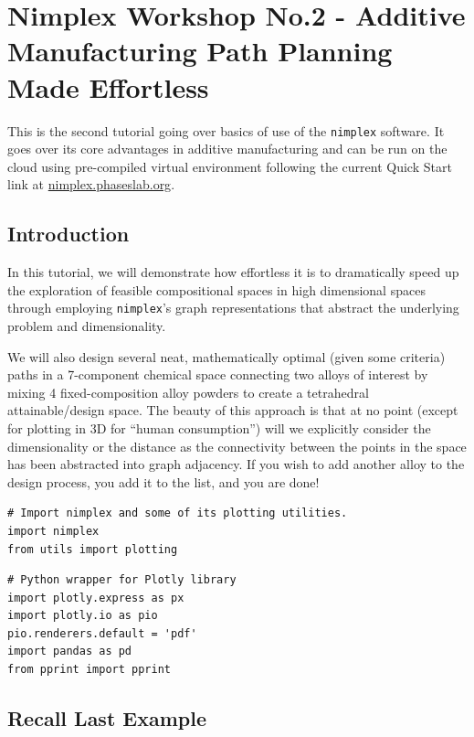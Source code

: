 \chapter{Nimplex Workshop No.2 - Additive Manufacturing Path Planning Made
Effortless} \label{chap:nimplextutorial2}

This is the second tutorial going over basics of use of the \texttt{nimplex} software. It goes over its core advantages in additive manufacturing and can be run on the cloud using pre-compiled virtual environment following the current Quick Start link at \href{https://nimplex.phaseslab.org}{nimplex.phaseslab.org}.

\section{Introduction}

In this tutorial, we will demonstrate how effortless it is to
dramatically speed up the exploration of feasible compositional spaces
in high dimensional spaces through employing
\texttt{nimplex}'s graph representations that abstract
the underlying problem and dimensionality.

We will also design several neat, mathematically optimal (given
some criteria) paths in a 7-component chemical space connecting two
alloys of interest by mixing 4 fixed-composition alloy powders to create
a tetrahedral attainable/design space. The beauty of this approach is
that at no point (except for plotting in 3D for ``human consumption'')
will we explicitly consider the dimensionality or the distance as the
connectivity between the points in the space has been abstracted into
graph adjacency. If you wish to add another alloy to the design process,
you add it to the list, and you are done!

\begin{verbatim}
# Import nimplex and some of its plotting utilities.
import nimplex
from utils import plotting
\end{verbatim}

\begin{verbatim}
# Python wrapper for Plotly library
import plotly.express as px
import plotly.io as pio
pio.renderers.default = 'pdf'
import pandas as pd
from pprint import pprint
\end{verbatim}

\section{Recall Last Example}\label{nimplextutorial2:recall-last-example}

